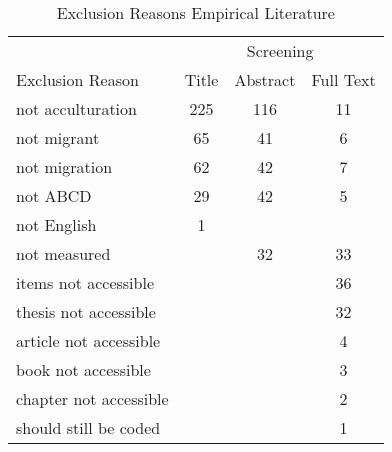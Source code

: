 \begin{table}
\begin{minipage}[t][\textheight][t]{\textwidth}

\caption{\label{tab:EmpiricalExclusion}Exclusion Reasons Empirical Literature}
\begin{tabular}[t]{lccc}
\toprule
\multicolumn{1}{c}{ } & \multicolumn{3}{c}{Screening} \\
\cmidrule(l{3pt}r{3pt}){2-4}
Exclusion Reason & Title & Abstract & Full Text\\
\midrule
not acculturation & 225 & 116 & 11\\
not migrant & 65 & 41 & 6\\
not migration & 62 & 42 & 7\\
not ABCD & 29 & 42 & 5\\
not English & 1 &  & \\
not measured &  & 32 & 33\\
items not accessible &  &  & 36\\
thesis not accessible &  &  & 32\\
article not accessible &  &  & 4\\
book not accessible &  &  & 3\\
chapter not accessible &  &  & 2\\
should still be coded &  &  & 1\\
\bottomrule
\end{tabular}
\end{minipage}
\end{table}
